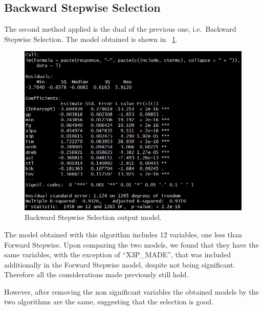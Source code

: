 \subsection{Backward Stepwise Selection}

The second method applied is the dual of the previous one, i.e.\ Backward Stepwise Selection. The model obtained is shown in \Fig~\ref{fig:BackwardModelSummary}.
\begin{figure}[h]
	\centering
	\includegraphics[width=0.35\linewidth]{ImageFiles/Regression/Backward/BackwardModelSummary}
	\caption{Backward Stepwise Selection output model.}
	\label{fig:BackwardModelSummary}
\end{figure}

The model obtained with this algorithm includes 12 variables, one less than Forward Stepwise. Upon comparing the two models, we found that they have the same variables, with the exception of ``X3P\_MADE'', that was included additionally in the Forward Stepwise model, despite not being significant.
Therefore all the considerations made previously still hold.

However, after removing the non significant variables the obtained models by the two algorithms are the same, suggesting that the selection is good.